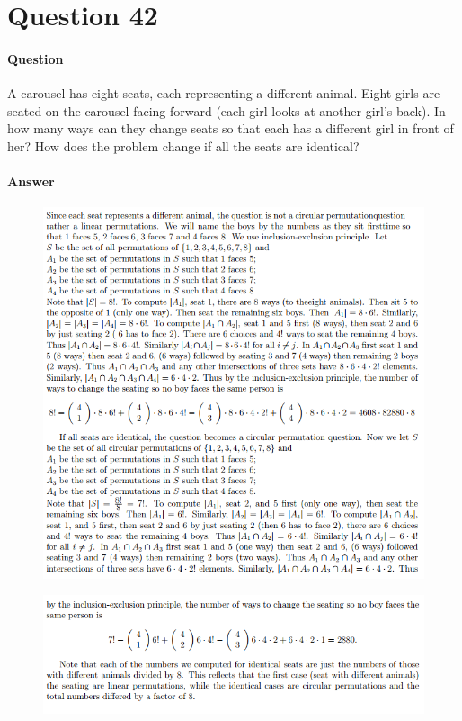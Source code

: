 \documentclass[UTF8]{article}
\begin{document}
    \section{Question 42}
    \paragraph{Question}
    A carousel has eight seats, each representing a different animal. Eight girls are seated on the carousel facing forward (each girl looks at another girl’s back). In how many ways can they change seats so that each has a different girl in front of her? How does the problem change if all the seats are identical?
    \paragraph{Answer}
    \begin{center}
        \begin{figure}[ht]
            \centering
            \includegraphics[scale=0.6]{img/t42_a1.png}
            \end{figure}
            \begin{figure}[ht]
                \centering
                \includegraphics[scale=0.6]{img/t42_a2.png}
                \end{figure}
    \end{center}
\end{document}
